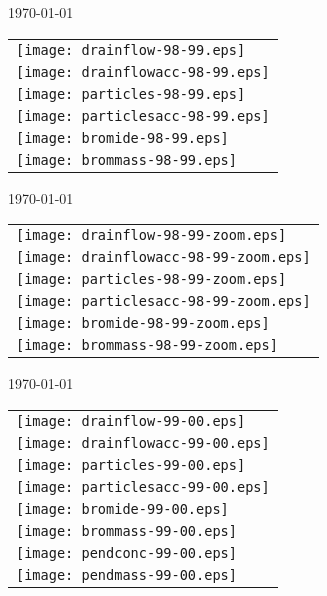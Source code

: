 \documentclass[a4paper]{article}
\begin{document}
\newpage
\today \\
%
\begin{tabular}{l}
\texttt{[image: drainflow-98-99.eps]} \\
\texttt{[image: drainflowacc-98-99.eps]} \\
\texttt{[image: particles-98-99.eps]} \\
\texttt{[image: particlesacc-98-99.eps]} \\
\texttt{[image: bromide-98-99.eps]} \\
\texttt{[image: brommass-98-99.eps]}
\end{tabular}

\newpage
\today \\
%
\begin{tabular}{l}
\texttt{[image: drainflow-98-99-zoom.eps]} \\
\texttt{[image: drainflowacc-98-99-zoom.eps]} \\
\texttt{[image: particles-98-99-zoom.eps]} \\
\texttt{[image: particlesacc-98-99-zoom.eps]} \\
\texttt{[image: bromide-98-99-zoom.eps]} \\
\texttt{[image: brommass-98-99-zoom.eps]}
\end{tabular}

\newpage
\today \\
%
\begin{tabular}{l}
\texttt{[image: drainflow-99-00.eps]} \\
\texttt{[image: drainflowacc-99-00.eps]} \\
\texttt{[image: particles-99-00.eps]} \\
\texttt{[image: particlesacc-99-00.eps]} \\
\texttt{[image: bromide-99-00.eps]} \\
\texttt{[image: brommass-99-00.eps]} \\
\texttt{[image: pendconc-99-00.eps]} \\
\texttt{[image: pendmass-99-00.eps]}
\end{tabular}
\end{document}
